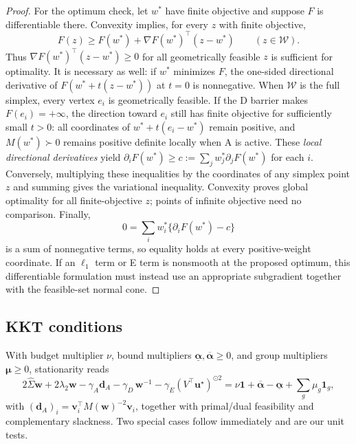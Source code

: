 \documentclass[11pt]{article}
\newcommand{\Sighat}{\hat\Sigma}
\newcommand{\one}{\mathbf{1}}
\newcommand{\w}{\mathbf{w}}
\newcommand{\vv}{\mathbf{v}}
\newcommand{\uu}{\mathbf{u}}
\newcommand{\M}{M(\w)}
\begin{document}
\begin{proof}
For the optimum check, let $w^*$ have finite objective and suppose $F$ is differentiable there. Convexity implies, for every $z$ with finite objective,
\begin{equation*}
F(z)\geq F(w^*)+\nabla F(w^*)^\top(z-w^*)\qquad(z\in\mathcal W).
\end{equation*}
Thus $\nabla F(w^*)^\top(z-w^*)\geq0$ for all geometrically feasible $z$ is sufficient for optimality. It is necessary as well: if $w^*$ minimizes $F$, the one-sided directional derivative of $F(w^*+t(z-w^*))$ at $t=0$ is nonnegative. When $\mathcal W$ is the full simplex, every vertex $e_i$ is geometrically feasible. If the D barrier makes $F(e_i)=+\infty$, the direction toward $e_i$ still has finite objective for sufficiently small $t>0$: all coordinates of $w^*+t(e_i-w^*)$ remain positive, and $M(w^*)\succ0$ remains positive definite locally when A is active. These \emph{local directional derivatives} yield $\partial_iF(w^*)\geq c:=\sum_jw_j^*\partial_jF(w^*)$ for each $i$. Conversely, multiplying these inequalities by the coordinates of any simplex point $z$ and summing gives the variational inequality. Convexity proves global optimality for all finite-objective $z$; points of infinite objective need no comparison. Finally,
\begin{equation*}
0=\sum_iw_i^*\{\partial_iF(w^*)-c\}
\end{equation*}
is a sum of nonnegative terms, so equality holds at every positive-weight coordinate. If an $\ell_1$ term or E term is nonsmooth at the proposed optimum, this differentiable formulation must instead use an appropriate subgradient together with the feasible-set normal cone.
\end{proof}

\subsection{KKT conditions}
With budget multiplier $\nu$, bound multipliers
$\underline{\boldsymbol\alpha},\overline{\boldsymbol\alpha}\ge0$, and group
multipliers $\boldsymbol\mu\ge0$, stationarity reads
\[
  2\Sighat\w+2\lambda_2\w-\gamma_A\mathbf d_A-\gamma_D\,\w^{-1}
  -\gamma_E(V^\top\uu^\star)^{\odot2}
  =\nu\one+\overline{\boldsymbol\alpha}-\underline{\boldsymbol\alpha}
   +\textstyle\sum_g\mu_g\one_g ,
\]
with $(\mathbf d_A)_i=\vv_i^\top\M^{-2}\vv_i$, together with primal/dual
feasibility and complementary slackness. Two special cases follow immediately and
are our unit tests.
\end{document}
